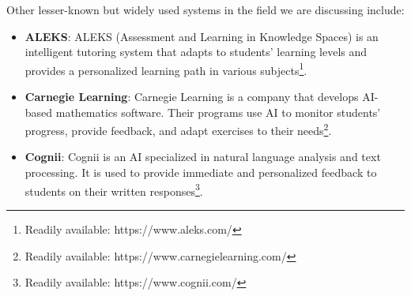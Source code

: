 \documentclass[a4paper,12pt]{article}
\begin{document}
Other lesser-known but widely used systems in the field we are discussing include:
\begin{itemize}
    \item \textbf{ALEKS}: ALEKS (Assessment and Learning in Knowledge Spaces) is an intelligent tutoring system that adapts to students' learning levels and provides a personalized learning path in various subjects\footnote{Readily available: https://www.aleks.com/}.
    \item \textbf{Carnegie Learning}: Carnegie Learning is a company that develops AI-based mathematics software. Their programs use AI to monitor students' progress, provide feedback, and adapt exercises to their needs\footnote{Readily available: https://www.carnegielearning.com/}.
    \item \textbf{Cognii}: Cognii is an AI specialized in natural language analysis and text processing. It is used to provide immediate and personalized feedback to students on their written responses\footnote{Readily available: https://www.cognii.com/}.
\end{itemize}

\end{document}
